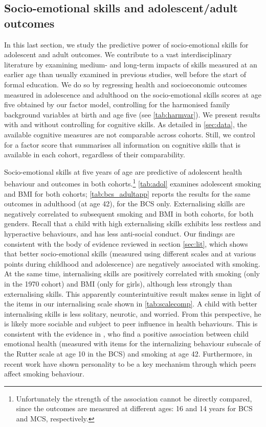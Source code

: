 \subsection{Socio-emotional skills and adolescent/adult outcomes}

In this last section, we study the predictive power of socio-emotional skills for adolescent and adult outcomes. We contribute to a vast interdisciplinary literature by examining medium- and long-term impacts of skills measured at an earlier age than usually examined in previous studies, well before the start of formal education. We do so by regressing health and socioeconomic outcomes measured in adolescence and adulthood on the socio-emotional skills scores at age five obtained by our factor model, controlling for the harmonised family background variables at birth and age five (see \autoref{tab:harmvar}). We present results with and without controlling for cognitive skills. As detailed in \autoref{sec:data}, the available cognitive measures are not comparable across cohorts. Still, we control for a factor score that summarises all information on cognitive skills that is available in each cohort, regardless of their comparability.

Socio-emotional skills at five years of age are predictive of adolescent health behaviour and outcomes in both cohorts.\footnote{Unfortunately the strength of the association cannot be directly compared, since the outcomes are measured at different ages: 16 and 14 years for BCS and MCS, respectively.} \autoref{tab:adol} examines adolescent smoking and BMI for both cohorts; \autoref{tab:bcs_adultapp} reports the results for the same outcomes in adulthood (at age 42), for the BCS only. Externalising skills are negatively correlated to subsequent smoking and BMI in both cohorts, for both genders. Recall that a child with high externalising skills exhibits less restless and hyperactive behaviours, and has less anti-social conduct. Our findings are consistent with the body of evidence reviewed in section \ref{sec:lit}, which shows that better socio-emotional skills (measured using different scales and at various points during childhood and adolescence) are negatively associated with smoking. At the same time, internalising skills are positively correlated with smoking (only in the 1970 cohort) and BMI (only for girls), although less strongly than externalising skills. This apparently counterintuitive result makes sense in light of the items in our internalising scale shown in \autoref{tab:scalecomp}. A child with better internalising skills is less solitary, neurotic, and worried. From this perspective, he is likely more sociable and subject to peer influence in health behaviours. This is consistent with the evidence in \citet{Goodman2015}, who find a positive association between child emotional health (measured with items for the internalizing behaviour subscale of the Rutter scale at age 10 in the BCS) and smoking at age 42. Furthermore, in recent work \citet{Hsieh2018} have shown personality to be a key mechanism through which peers affect smoking behaviour.

